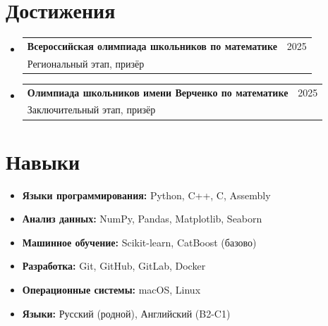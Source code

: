 \documentclass[a4paper,11pt]{article}
\makeatletter
\newcommand{\resumeSubheading}[3]{
  \vspace{-2pt}\item
    \begin{tabular*}{0.97\textwidth}[t]{l@{\extracolsep{\fill}}r}
      \textbf{#1} & #2 \\
      \small #3 & \\
    \end{tabular*}\vspace{-7pt}
}
\newcommand{\resumeProjectHeading}[2]{
    \item
    \begin{tabular*}{0.97\textwidth}{l@{\extracolsep{\fill}}r}
      \small #1 & #2 \\
    \end{tabular*}\vspace{-7pt}
}
\newcommand{\resumeSubHeadingListStart}{\begin{itemize}[leftmargin=0.15in, label={}]}
\newcommand{\resumeSubHeadingListEnd}{\end{itemize}}
\makeatother
\begin{document}
\section{Достижения}
  \resumeSubHeadingListStart
    \resumeSubheading
      {Всероссийская олимпиада школьников по математике}{2025}
      {Региональный этап, призёр}
    \resumeSubheading
      {Олимпиада школьников имени Верченко по математике}{2025}
      {Заключительный этап, призёр}
    \resumeSubHeadingListEnd


\section{Навыки}
\begin{itemize}[itemsep=2pt, topsep=2pt]
    \item \textbf{Языки программирования:} Python, C++, C, Assembly
    \item \textbf{Анализ данных:} NumPy, Pandas, Matplotlib, Seaborn
    \item \textbf{Машинное обучение:} Scikit-learn, CatBoost (базово)
    \item \textbf{Разработка:} Git, GitHub, GitLab, Docker
    \item \textbf{Операционные системы:} macOS, Linux
    \item \textbf{Языки:} Русский (родной), Английский (B2-C1)
\end{itemize}
\end{document}

